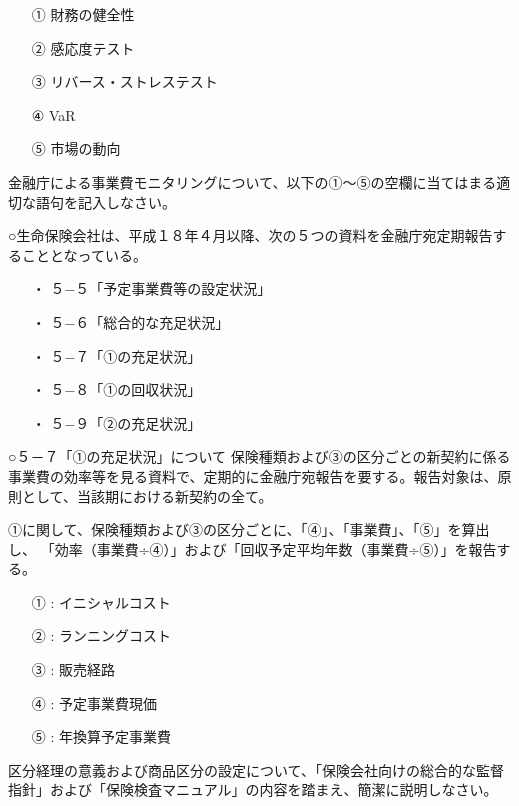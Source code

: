 \documentclass[report,gutter=10mm,fore-edge=10mm,uplatex,dvipdfmx]{jlreq}
\begin{document}
\answer{}

\begin{itemize}
 \item[①] 財務の健全性
 \item[②] 感応度テスト
 \item[③] リバース・ストレステスト
 \item[④] VaR
 \item[⑤] 市場の動向
\end{itemize}

金融庁による事業費モニタリングについて、以下の①〜⑤の空欄に当てはまる適切な語句を記入しなさい。

○生命保険会社は、平成１８年４月以降、次の５つの資料を金融庁宛定期報告することとなっている。
\begin{itemize}
\item[ ・]  ５−５「予定事業費等の設定状況」
\item[ ・]  ５−６「総合的な充足状況」
\item[ ・]  ５−７「①の充足状況」
\item[ ・]  ５−８「①の回収状況」
\item[ ・]  ５−９「②の充足状況」
\end{itemize}

○５－７「①の充足状況」について
保険種類および③の区分ごとの新契約に係る事業費の効率等を見る資料で、定期的に金融庁宛報告を要する。報告対象は、原則として、当該期における新契約の全て。

①に関して、保険種類および③の区分ごとに、「④」、「事業費」、「⑤」を算出し、
「効率（事業費÷④）」および「回収予定平均年数（事業費÷⑤）」を報告する。
\answer{}
\begin{itemize}
\item[① : ] イニシャルコスト
\item[② : ] ランニングコスト
\item[③ : ] 販売経路
\item[④ : ] 予定事業費現価
\item[⑤ : ] 年換算予定事業費
\end{itemize}

区分経理の意義および商品区分の設定について、「保険会社向けの総合的な監督指針」および「保険検査マニュアル」の内容を踏まえ、簡潔に説明しなさい。

\answer{}
\end{document}
